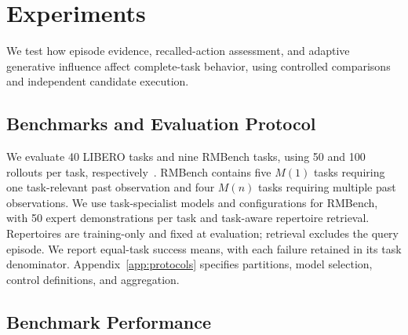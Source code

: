 \section{Experiments}
\label{sec:experiments}
We test how episode evidence, recalled-action assessment, and adaptive generative influence affect complete-task behavior, using controlled comparisons and independent candidate execution.

\subsection{Benchmarks and Evaluation Protocol}
\label{sec:protocol}
We evaluate 40 LIBERO tasks and nine RMBench tasks, using 50 and 100 rollouts per task, respectively~\citep{liu2023libero,chen2026rmbench}.
RMBench contains five $M(1)$ tasks requiring one task-relevant past observation and four $M(n)$ tasks requiring multiple past observations.
We use task-specialist models and configurations for RMBench, with 50 expert demonstrations per task and task-aware repertoire retrieval.
Repertoires are training-only and fixed at evaluation; retrieval excludes the query episode.
We report equal-task success means, with each failure retained in its task denominator. Appendix~\ref{app:protocols} specifies partitions, model selection, control definitions, and aggregation.

\subsection{Benchmark Performance}
\label{sec:benchmark_results}
